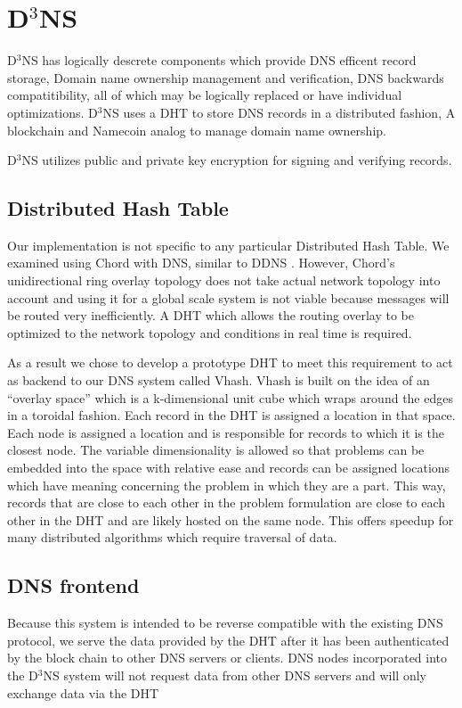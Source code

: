 \documentclass[11pt]{IEEEtran} %
\begin{document}
\section{D$^{3}$NS}
D$^{3}$NS has logically descrete components which provide DNS efficent record storage, Domain name ownership management and verification, DNS backwards compatitibility, all of which may be logically replaced or have individual optimizations. D$^{3}$NS uses a DHT to store DNS records in a distributed fashion, A blockchain and Namecoin\cite{namecoin} analog to manage domain name ownership.

D$^{3}$NS utilizes public and private key encryption for signing and verifying records.


\subsection{Distributed Hash Table}
Our implementation is not specific to any particular Distributed Hash Table.  We examined using Chord \cite{chord} with DNS, similar to DDNS \cite{cox}.  However, Chord’s unidirectional ring overlay topology does not take actual network topology into account and using it for a global scale system is not viable because messages will be routed very inefficiently. A DHT which allows the routing overlay to be optimized to the network topology and conditions in real time is required.

As a result we chose to develop a prototype DHT to meet this requirement to act as backend to our DNS system called Vhash. Vhash is built on the idea of an “overlay space” which is a k-dimensional unit cube which wraps around the edges in a toroidal fashion. Each record in the DHT is assigned a location in that space. Each node is assigned a location and is responsible for records to which it is the closest node. The variable dimensionality is allowed so that problems can be embedded into the space with relative ease and records can be assigned locations which have meaning concerning the problem in which they are a part. This way, records that are close to each other in the problem formulation are close to each other in the DHT and are likely hosted on the same node. This offers speedup for many distributed algorithms which require traversal of data.



\subsection{DNS frontend}
Because this system is intended to be reverse compatible with the existing DNS protocol, we serve the data provided by the DHT after it has been authenticated by the block chain to other DNS servers or clients. DNS nodes incorporated into the D$^3$NS system will not request data from other DNS servers and will only exchange data via the DHT 
\end{document}

